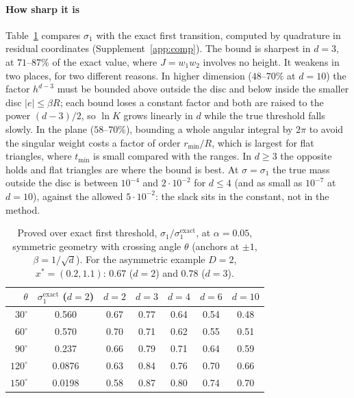 \paragraph{How sharp it is} Table~\ref{tab:sharp} compares $\sigma_1$ with the exact first transition, computed by
quadrature in residual coordinates (Supplement~\ref{app:comp}). The bound is sharpest in $d = 3$, at $71$--$87\%$ of the exact value, where $J = w_1w_2$ involves no
height. It weakens in two places, for two different reasons. In higher dimension ($48$--$70\%$ at $d = 10$) the factor
$h^{d-3}$ must be bounded above outside the disc and below inside the smaller disc $|e| \le \beta R$; each bound loses
a constant factor and both are raised to the power $(d-3)/2$, so $\ln K$ grows linearly in $d$ while the true threshold
falls slowly. In the plane ($58$--$70\%$), bounding a whole angular integral by $2\pi$ to avoid the singular weight costs
a factor of order $r_{\min}/R$, which is largest for flat triangles, where $t_{\min}$ is small compared with the ranges.
In $d \ge 3$ the opposite holds and flat triangles are where the bound is best. At $\sigma = \sigma_1$ the true mass
outside the disc is between $10^{-4}$ and $2\cdot10^{-2}$ for $d \le 4$ (and as small as $10^{-7}$ at $d = 10$), against
the allowed $5\cdot10^{-2}$: the slack sits in the constant, not in the method.

\begin{table}[t]\centering\small
\caption{Proved over exact first threshold, $\sigma_1/\sigma_1^{\mathrm{exact}}$, at $\alpha = 0.05$, symmetric geometry
with crossing angle $\theta$ (anchors at $\pm1$, $\beta = 1/\sqrt d$). For the asymmetric example $D = 2$,
$x^* = (0.2, 1.1)$: $0.67$ ($d = 2$) and $0.78$ ($d = 3$).}\label{tab:sharp}
\begin{tabular}{rc@{\qquad}ccccc}\toprule
$\theta$ & $\sigma_1^{\mathrm{exact}}$ ($d = 2$) & $d = 2$ & $d = 3$ & $d = 4$ & $d = 6$ & $d = 10$\\\midrule
$30^\circ$ & 0.560 & 0.67 & 0.77 & 0.64 & 0.54 & 0.48\\
$60^\circ$ & 0.570 & 0.70 & 0.71 & 0.62 & 0.55 & 0.51\\
$90^\circ$ & 0.237 & 0.66 & 0.79 & 0.71 & 0.64 & 0.59\\
$120^\circ$ & 0.0876 & 0.63 & 0.84 & 0.76 & 0.70 & 0.66\\
$150^\circ$ & 0.0198 & 0.58 & 0.87 & 0.80 & 0.74 & 0.70\\\bottomrule
\end{tabular}
\end{table}

